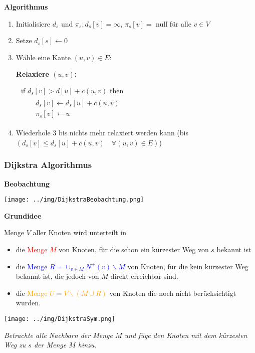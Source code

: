 \documentclass[german]{latex4ei/latex4ei_sheet}
\begin{document}
\begin{sectionbox}
\textbf{Algorithmus}\smallskip
\begin{enumerate}
    \item Initialisiere $d_{s}$ und $\pi_{s}: d_{s}[v]=\infty$, $\pi_{s}[v]=$ null für alle $v \in V$
    \item Setze $d_{s}[s] \leftarrow 0$
    \item Wähle eine Kante $(u, v) \in E$:\par
    \begin{greenbox}
    \textbf{Relaxiere $(u, v)$:}\par
    $\begin{array}{l}
    \text { if } d_{s}[v]>d[u]+c(u, v) \text { then } \\
    \qquad \begin{array}{l}
    d_{s}[v] \leftarrow d_{s}[u]+c(u, v) \\
    \pi_{s}[v] \leftarrow u
    \end{array}
    \end{array}$
    \end{greenbox}
    \item Wiederhole 3 bis nichts mehr relaxiert werden kann (bis $\left(d_{s}[v] \leq d_{s}[u]+c(u, v) \quad \forall(u, v) \in E\right)$)
\end{enumerate}\vspace{10px}

\subsubsection{Dijkstra Algorithmus}\smallskip
\textbf{Beobachtung}\par
\begin{center}
    \texttt{[image: ../img/DijkstraBeobachtung.png]}\par
\end{center}\smallskip

\textbf{Grundidee}\par
Menge $V$ aller Knoten wird unterteilt in
\begin{itemize}
    \item die \textcolor{red}{Menge $M$} von Knoten, für die schon ein kürzester Weg von $s$ bekannt ist
    \item die \textcolor{blue}{Menge $R=\cup_{v \in M} N^{+}(v) \backslash M$} von Knoten, für die kein kürzester Weg bekannt ist, die jedoch von $M$ direkt erreichbar sind.
    \item die \textcolor{orange}{Menge $U=V \backslash(M \cup R)$} von Knoten die noch nicht berücksichtigt wurden.
\end{itemize}

\begin{center}
    \texttt{[image: ../img/DijkstraSym.png]}\par
\end{center}
\textit{Betrachte alle Nachbarn der Menge $M$ und füge den Knoten mit dem kürzesten Weg zu $s$ der Menge $M$ hinzu.}\par
\end{sectionbox}
\end{document}
